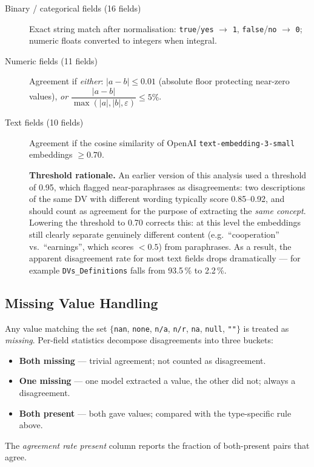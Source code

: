 \documentclass[11pt,a4paper]{article}
\begin{document}
\begin{description}
  \item[Binary / categorical fields (16 fields)]
    Exact string match after normalisation: \texttt{true}/\texttt{yes}
    $\rightarrow$ \texttt{1}, \texttt{false}/\texttt{no} $\rightarrow$ \texttt{0};
    numeric floats converted to integers when integral.

  \item[Numeric fields (11 fields)]
    Agreement if \emph{either}:
    $|a - b| \leq 0.01$ (absolute floor protecting near-zero values),
    \emph{or} $\dfrac{|a - b|}{\max(|a|,|b|,\varepsilon)} \leq 5\%$.

  \item[Text fields (10 fields)]
    Agreement if the cosine similarity of OpenAI
    \texttt{text-embedding-3-small} embeddings $\geq 0.70$.

    \textbf{Threshold rationale.}  An earlier version of this analysis used a
    threshold of 0.95, which flagged near-paraphrases as disagreements:
    two descriptions of the same DV with different wording typically score
    0.85--0.92, and should count as agreement for the purpose of extracting
    the \emph{same concept}.  Lowering the threshold to 0.70 corrects this:
    at this level the embeddings still clearly separate genuinely different
    content (e.g.\ ``cooperation'' vs.\ ``earnings'', which scores $<0.5$)
    from paraphrases.  As a result, the apparent disagreement rate for most
    text fields drops dramatically --- for example
    \texttt{DVs\_Definitions} falls from 93.5\,\% to 2.2\,\%.
\end{description}

\subsection{Missing Value Handling}
Any value matching the set
$\{$\texttt{nan}, \texttt{none}, \texttt{n/a}, \texttt{n/r},
\texttt{na}, \texttt{null}, \texttt{""}$\}$ is treated as \emph{missing}.
Per-field statistics decompose disagreements into three buckets:
\begin{itemize}
  \item \textbf{Both missing} --- trivial agreement; not counted as disagreement.
  \item \textbf{One missing} --- one model extracted a value, the other did not;
    always a disagreement.
  \item \textbf{Both present} --- both gave values; compared with the
    type-specific rule above.
\end{itemize}
The \emph{agreement rate present} column reports the fraction of both-present
pairs that agree.
\end{document}
